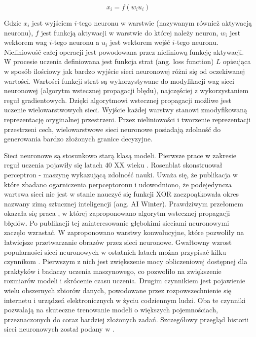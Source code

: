 \documentclass[oneside, mag]{mgr}
\begin{document}
\begin{equation}
	x_i = f(w_i u_i)
\end{equation}

Gdzie $x_i$ jest wyjściem $i$-tego neuronu w warstwie (nazywanym również aktywacją neuronu), $f$ jest funkcją aktywacji w warstwie do której należy neuron, $w_i$ jest wektorem wag $i$-tego neuronu a $u_i$ jest wektorem wejść $i$-tego neuronu. Nieliniowość całej operacji jest powodowana przez nieliniową funkcję aktywacji. W procesie uczenia definiowana jest funkcja strat (ang. loss function) $L$ opisująca w sposób ilościowy jak bardzo wyjście sieci neuronowej różni się od oczekiwanej wartości. Wartości funkcji strat są wykorzystywane do modyfikacji wag sieci neuronowej (algorytm wstecznej propagacji błędu), najczęściej z wykorzystaniem reguł gradientowych. Dzięki algorytmowi wstecznej propagacji możliwe jest uczenie wielowarstwowych sieci. Wyjście każdej warstwy stanowi zmodyfikowaną reprezentację oryginalnej przestrzeni. Przez nieliniowości i tworzenie reprezentacji przestrzeni cech, wielowarstwowe sieci neuronowe posiadają zdolność do generowania bardzo złożonych granice decyzyjne.

Sieci neuronowe są stosunkowo starą klasą modeli. Pierwsze prace w zakresie reguł uczenia pojawiły się latach 40 XX wieku \cite{McCulloch-Pitts} \cite{Hebb}. Rosenblat \cite{Rosenblatt} skonstruował perceptron - maszynę wykazującą zdolność nauki. Uważa się, że publikacja w które zbadano ogarniczenia perpceptoronu i udowodniono, że podejedyncza wartswa sieci nie jest w stanie nauczyć się funkcji XOR \cite{Perceptrons} zaczpoątkowała okres nazwany zimą sztucznej inteligencji (ang. AI Winter). Prawdziwym przełomem okazała się praca \cite{Rumelhart}, w której zaproponowano algorytm wstecznej propagacji błędów. Po publikacji tej zainteresowanie głębokimi sieciami neuronowymi zaczęło wzrastać. W \cite{Conv} zaproponowano warstwy konwolucyjne, które pozwoliły na łatwiejsze przetwarzanie obrazów przez sieci neuronowe. 
Gwałtowny wzrost popularności sieci neuronowych w ostatnich latach można przypisać kilku czynnikom \cite{Goodfellow-et-al-2016}. Pierwszym z nich jest zwiększenie mocy obliczeniowej dostępnej dla praktyków i badaczy uczenia maszynowego, co pozwoliło na zwiększenie rozmiarów modeli i skrócenie czasu uczenia. Drugim czynnikiem jest pojawienie wielu obszernych zbiorów danych, powodowane przez rozpowszechnienie się internetu i urządzeń elektronicznych w życiu codziennym ludzi. Oba te czynniki pozwalają na skuteczne trenowanie modeli o większych pojemnościach, przeznaczonych do coraz bardziej złożonych zadań. Szczegółowy przegląd historii sieci neuronowych został podany w \cite{DBLP:journals/corr/Schmidhuber14}.
\end{document}
